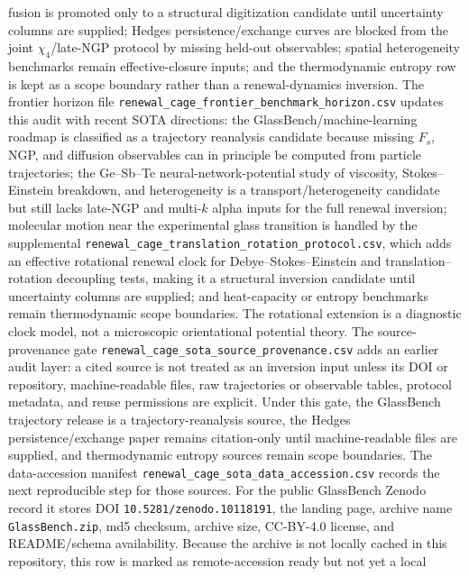 \documentclass[aps,preprint,onecolumn,superscriptaddress,nofootinbib]{revtex4-2}
\begin{document}
fusion is promoted only to a structural digitization candidate until
uncertainty columns are supplied; Hedges persistence/exchange curves are
blocked from the joint $\chi_4$/late-NGP protocol by missing held-out
observables; spatial heterogeneity benchmarks remain effective-closure inputs;
and the thermodynamic entropy row is kept as a scope boundary rather than a
renewal-dynamics inversion.
The frontier horizon file
\texttt{renewal\_cage\_frontier\_benchmark\_horizon.csv} updates this audit
with recent SOTA directions: the GlassBench/machine-learning roadmap
\cite{jung2025roadmap} is classified as a trajectory reanalysis candidate
because missing $F_s$, NGP, and diffusion observables can in principle be
computed from particle trajectories; the Ge--Sb--Te neural-network-potential
study of viscosity, Stokes--Einstein breakdown, and heterogeneity
\cite{marcorini2025gst} is a transport/heterogeneity candidate but still lacks
late-NGP and multi-$k$ alpha inputs for the full renewal inversion; molecular
motion near the experimental glass transition \cite{simon2026molecular} is
handled by the supplemental
\texttt{renewal\_cage\_translation\_rotation\_protocol.csv}, which adds an
effective rotational renewal clock for Debye--Stokes--Einstein and
translation--rotation decoupling tests, making it a structural inversion
candidate until uncertainty columns are supplied; and heat-capacity or entropy
benchmarks remain thermodynamic scope boundaries. The rotational extension is a
diagnostic clock model, not a microscopic orientational potential theory.
The source-provenance gate
\texttt{renewal\_cage\_sota\_source\_provenance.csv} adds an earlier audit
layer: a cited source is not treated as an inversion input unless its DOI or
repository, machine-readable files, raw trajectories or observable tables,
protocol metadata, and reuse permissions are explicit. Under this gate, the
GlassBench trajectory release is a trajectory-reanalysis source, the Hedges
persistence/exchange paper remains citation-only until machine-readable files
are supplied, and thermodynamic entropy sources remain scope boundaries.
The data-accession manifest
\texttt{renewal\_cage\_sota\_data\_accession.csv} records the next reproducible
step for those sources. For the public GlassBench Zenodo record it stores DOI
\texttt{10.5281/zenodo.10118191}, the landing page, archive name
\texttt{GlassBench.zip}, md5 checksum, archive size, CC-BY-4.0 license, and
README/schema availability. Because the archive is not locally cached in this
repository, this row is marked as remote-accession ready but not yet a local
\end{document}
